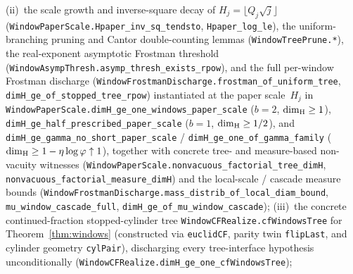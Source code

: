 \begin{remark}
(ii)~the scale growth and inverse-square decay of $H_j=\lfloor Q_j\sqrt{j}\rfloor$ (\texttt{WindowPaperScale.\allowbreak Hpaper\_\allowbreak inv\_\allowbreak sq\_\allowbreak tendsto}, \texttt{Hpaper\_\allowbreak log\_\allowbreak le}), the uniform-branching pruning and Cantor double-counting lemmas (\texttt{WindowTreePrune.*}), the real-exponent asymptotic Frostman threshold (\texttt{WindowAsympThresh.\allowbreak asymp\_\allowbreak thresh\_\allowbreak exists\_\allowbreak rpow}), and the full per-window Frostman discharge (\texttt{WindowFrostmanDischarge.\allowbreak frostman\_\allowbreak of\_\allowbreak uniform\_\allowbreak tree}, \texttt{dimH\_\allowbreak ge\_\allowbreak of\_\allowbreak stopped\_\allowbreak tree\_\allowbreak rpow}) instantiated at the paper scale~$H_j$ in \texttt{WindowPaperScale.\allowbreak dimH\_\allowbreak ge\_\allowbreak one\_\allowbreak windows\_\allowbreak paper\_\allowbreak scale} ($b=2$, $\dim_{\mathrm{H}}\ge 1$), \texttt{dimH\_\allowbreak ge\_\allowbreak half\_\allowbreak prescribed\_\allowbreak paper\_\allowbreak scale} ($b=1$, $\dim_{\mathrm{H}}\ge 1/2$), and \texttt{dimH\_\allowbreak ge\_\allowbreak gamma\_\allowbreak no\_\allowbreak short\_\allowbreak paper\_\allowbreak scale} / \texttt{dimH\_\allowbreak ge\_\allowbreak one\_\allowbreak of\_\allowbreak gamma\_\allowbreak family} ($\dim_{\mathrm{H}}\ge 1-\eta\log\varphi\uparrow 1$), together with concrete tree- and measure-based non-vacuity witnesses (\texttt{WindowPaperScale.\allowbreak nonvacuous\_\allowbreak factorial\_\allowbreak tree\_\allowbreak dimH}, \texttt{nonvacuous\_\allowbreak factorial\_\allowbreak measure\_\allowbreak dimH}) and the local-scale / cascade measure bounds (\texttt{WindowFrostmanDischarge.\allowbreak mass\_\allowbreak distrib\_\allowbreak of\_\allowbreak local\_\allowbreak diam\_\allowbreak bound}, \texttt{mu\_\allowbreak window\_\allowbreak cascade\_\allowbreak full}, \texttt{dimH\_\allowbreak ge\_\allowbreak of\_\allowbreak mu\_\allowbreak window\_\allowbreak cascade});
(iii)~the concrete continued-fraction stopped-cylinder tree \texttt{WindowCFRealize.\allowbreak cfWindowsTree} for Theorem~\ref{thm:windows} (constructed via \texttt{euclidCF}, parity twin \texttt{flipLast}, and cylinder geometry \texttt{cylPair}), discharging every tree-interface hypothesis unconditionally (\texttt{WindowCFRealize.\allowbreak dimH\_\allowbreak ge\_\allowbreak one\_\allowbreak cfWindowsTree});

\end{remark}
